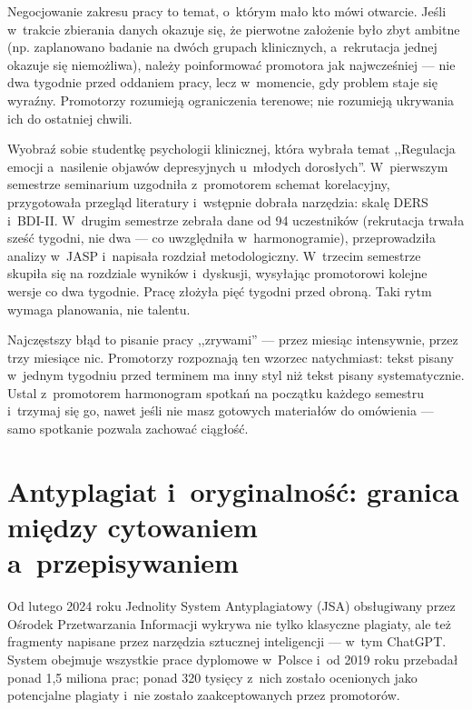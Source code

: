 \documentclass[12pt,a4paper,twoside,openany]{book}
\let\bforigsection\section
\renewcommand{\section}{\needspace{4\baselineskip}\bforigsection}
\begin{document}
Negocjowanie zakresu pracy to temat, o~którym mało kto mówi otwarcie. Jeśli w~trakcie zbierania danych okazuje się, że pierwotne założenie było zbyt ambitne (np. zaplanowano badanie na dwóch grupach klinicznych, a~rekrutacja jednej okazuje się niemożliwa), należy poinformować promotora jak najwcześniej --- nie dwa tygodnie przed oddaniem pracy, lecz w~momencie, gdy problem staje się wyraźny. Promotorzy rozumieją ograniczenia terenowe; nie rozumieją ukrywania ich do ostatniej chwili.

\begin{examplebox}
Wyobraź sobie studentkę psychologii klinicznej, która wybrała temat ,,Regulacja emocji a~nasilenie objawów depresyjnych u~młodych dorosłych''. W~pierwszym semestrze seminarium uzgodniła z~promotorem schemat korelacyjny, przygotowała przegląd literatury i~wstępnie dobrała narzędzia: skalę DERS i~BDI-II. W~drugim semestrze zebrała dane od 94 uczestników (rekrutacja trwała sześć tygodni, nie dwa --- co uwzględniła w~harmonogramie), przeprowadziła analizy w~JASP i~napisała rozdział metodologiczny. W~trzecim semestrze skupiła się na rozdziale wyników i~dyskusji, wysyłając promotorowi kolejne wersje co dwa tygodnie. Pracę złożyła pięć tygodni przed obroną. Taki rytm wymaga planowania, nie talentu.
\end{examplebox}

\begin{keyinsight}
Najczęstszy błąd to pisanie pracy ,,zrywami'' --- przez miesiąc intensywnie, przez trzy miesiące nic. Promotorzy rozpoznają ten wzorzec natychmiast: tekst pisany w~jednym tygodniu przed terminem ma inny styl niż tekst pisany systematycznie. Ustal z~promotorem harmonogram spotkań na początku każdego semestru i~trzymaj się go, nawet jeśli nie masz gotowych materiałów do omówienia --- samo spotkanie pozwala zachować ciągłość.
\end{keyinsight}

\section{Antyplagiat i~oryginalność: granica między cytowaniem a~przepisywaniem}

Od lutego 2024 roku Jednolity System Antyplagiatowy (JSA) obsługiwany przez Ośrodek Przetwarzania Informacji wykrywa nie tylko klasyczne plagiaty, ale też fragmenty napisane przez narzędzia sztucznej inteligencji --- w~tym ChatGPT. System obejmuje wszystkie prace dyplomowe w~Polsce i~od 2019 roku przebadał ponad 1,5 miliona prac; ponad 320 tysięcy z~nich zostało ocenionych jako potencjalne plagiaty i~nie zostało zaakceptowanych przez promotorów.
\end{document}
